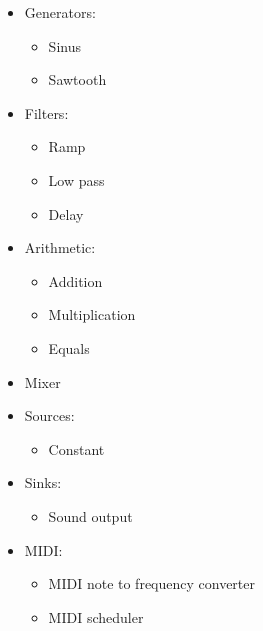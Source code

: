 \begin{itemize}
\item Generators:
\begin{itemize}
\item Sinus
\item Sawtooth
\end{itemize}

\item Filters:
\begin{itemize}
\item Ramp
\item Low pass
\item Delay
\end{itemize}

\item Arithmetic:
\begin{itemize}
\item Addition 
\item Multiplication
\item Equals
\end{itemize}

\item Mixer

\item Sources:
\begin{itemize}
\item Constant
\end{itemize}

\item Sinks:
\begin{itemize}
\item Sound output
\end{itemize}

\item MIDI: 
\begin{itemize}
\item MIDI note to frequency converter
\item MIDI scheduler
\end{itemize}

\end{itemize}